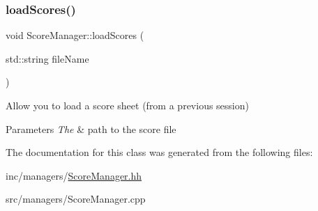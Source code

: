 \subsubsection{\texorpdfstring{load\+Scores()}{loadScores()}}
{\footnotesize\ttfamily void Score\+Manager\+::load\+Scores (\begin{DoxyParamCaption}\item[{std\+::string}]{file\+Name }\end{DoxyParamCaption})}



Allow you to load a score sheet (from a previous session) 


\begin{DoxyParams}{Parameters}
{\em The} & path to the score file \\
\hline
\end{DoxyParams}


The documentation for this class was generated from the following files\+:\begin{DoxyCompactItemize}
\item 
inc/managers/\hyperlink{ScoreManager_8hh}{Score\+Manager.\+hh}\item 
src/managers/Score\+Manager.\+cpp\end{DoxyCompactItemize}
